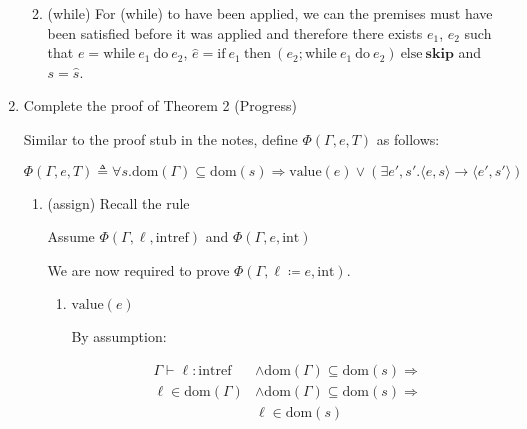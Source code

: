 \documentclass[10pt,\jkfside,a4paper]{article}
\begin{document}
\begin{enumerate}
\begin{enumerate}[label=\arabic{inversion}.]

\item (while) For (while) to have been applied, we can the premises must have
been satisfied before it was applied and therefore there exists $e_1$,
$e_2$ such that $e = \text{while} \ e_1 \ \text{do} \ e_2$,
$\hat{e} = \text{if} \ e_1 \ \text{then} \ (e_2; \text{while} \ e_1 \
\text{do} \ e_2) \ \text{else} \ \textbf{skip}$ and $s = \hat{s}$.

\end{enumerate}

\setcounter{enumi}{13}

\item Complete the proof of Theorem 2 (Progress)

Similar to the proof stub in the notes, define $\Phi(\Gamma, e, T)$ as follows:

\[
\Phi(\Gamma, e, T) \triangleq \forall s. \text{dom}(\Gamma) \subseteq
\text{dom}(s) \Longrightarrow \text{value}(e) \vee (\exists e', s'. \langle
e, s \rangle \to \langle e', s' \rangle )
\]

\begin{enumerate}[label=\textbf{Case}]

\item (assign) Recall the rule

\begin{center}
\begin{prooftree}
\end{prooftree}
\end{center}

Assume $\Phi(\Gamma, \ell,\text{intref})$ and $\Phi(\Gamma, e, \text{int})$

We are now required to prove $\Phi(\Gamma, \ell \coloneqq e, \text{int})$.

\begin{enumerate}[label=\textbf{case}]

\item $\text{value}(e)$

By assumption:

\[
\begin{split}
\Gamma\vdash \ell: \text{intref} &\wedge \text{dom}(\Gamma) \subseteq
\text{dom}(s) \Longrightarrow \\
\ell \in \text{dom}(\Gamma) &\wedge \text{dom}(\Gamma) \subseteq
\text{dom}(s) \Longrightarrow \\
&\ell \in \text{dom}(s)
\end{split}
\]


\end{enumerate}
\end{enumerate}
\end{enumerate}
\end{document}
